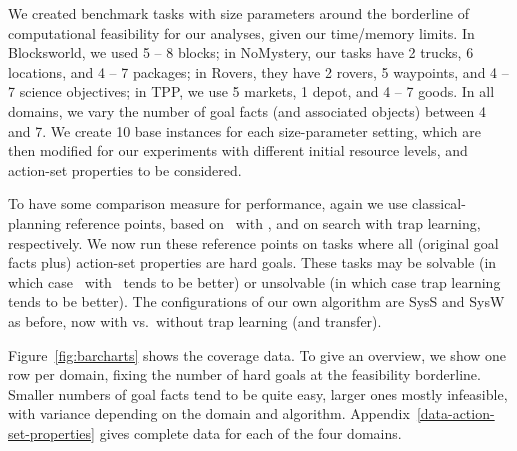 We created benchmark tasks with size parameters around the borderline
of computational feasibility for our analyses, given our time/memory
limits. In Blocksworld, we used 5 -- 8 blocks; in NoMystery, our tasks
have 2 trucks, 6 locations, and 4 -- 7 packages; in Rovers, they have
2 rovers, 5 waypoints, and 4 -- 7 science objectives; in TPP, we use 5
markets, 1 depot, and 4 -- 7 goods. In all domains, we vary the number
of goal facts (and associated objects) between 4 and 7. We create 10
base instances for each size-parameter setting, which are then
modified for our experiments with different initial resource levels,
and action-set properties to be considered.
%

To have some comparison measure for performance, again we use
classical-planning reference points, based on \astar\ with \hlmcut,
and on search with trap learning, respectively. We now run these
reference points on tasks where all (original goal facts plus)
action-set properties are hard goals. These tasks may be solvable (in
which case \astar\ with \hlmcut\ tends to be better) or unsolvable (in
which case trap learning tends to be better). The configurations of
our own algorithm are SysS and SysW as before, now with vs.\ without
trap learning (and transfer).

Figure~\ref{fig:barcharts} shows the coverage data. To give an
overview, we show one row per domain, fixing the number of hard goals
at the feasibility borderline. Smaller numbers of goal facts tend to
be quite easy, larger ones mostly infeasible, with variance depending
on the domain and algorithm.
Appendix~\ref{data-action-set-properties} gives complete data for each
of the four domains.

